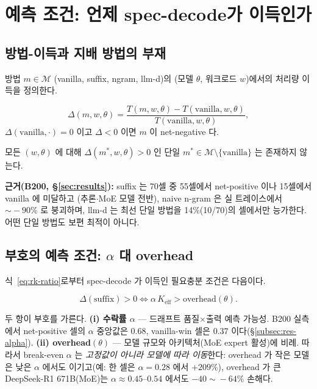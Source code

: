 
\section{예측 조건: 언제 spec-decode가 이득인가}
\label{sec:problem}

\subsection{방법-이득과 지배 방법의 부재}

방법 $m \in \mathcal{M}$ (vanilla, suffix, ngram, llm-d)의
(모델 $\theta$, 워크로드 $w$)에서의 처리량 이득을 정의한다.

\begin{definition}[방법-이득]
\label{def:method-gain}
\[
\Delta(m, w, \theta) = \frac{T(m, w, \theta) - T(\mathrm{vanilla}, w, \theta)}
                            {T(\mathrm{vanilla}, w, \theta)},
\]
$\Delta(\mathrm{vanilla},\cdot)=0$ 이고 $\Delta<0$ 이면 $m$ 이 net-negative 다.
\end{definition}

\begin{property}[지배 방법의 부재]
\label{prop:no-dominant}
모든 $(w,\theta)$ 에 대해 $\Delta(m^*,w,\theta)>0$ 인 단일
$m^*\in\mathcal{M}\setminus\{\mathrm{vanilla}\}$ 는 존재하지 않는다.
\end{property}

\noindent\textbf{근거(B200, \S\ref{sec:results}):}
suffix 는 70셀 중 55셀에서 net-positive 이나 15셀에서 vanilla 에 미달하고
(추론$\cdot$MoE 모델 전반), naive n-gram 은 실 트레이스에서 $\sim\!-90\%$ 로 붕괴하며,
llm-d 는 최선 단일 방법을 14\%(10/70)의 셀에서만 능가한다.
어떤 단일 방법도 보편 최적이 아니다.

\subsection{부호의 예측 조건: $\alpha$ 대 overhead}

식~\ref{eq:rk-ratio}로부터 spec-decode 가 이득인 필요충분 조건은 다음이다.

\begin{equation}
\Delta(\mathrm{suffix}) > 0 \iff \alpha\,K_{\mathrm{eff}} > \mathrm{overhead}(\theta).
\label{eq:rk-condition}
\end{equation}

두 항이 부호를 가른다.
\textbf{(i) 수락률 $\alpha$} — 드래프트 품질$\times$출력 예측 가능성.
B200 실측에서 net-positive 셀의 $\alpha$ 중앙값은 $0.68$,
vanilla-win 셀은 $0.37$ 이다(\S\ref{subsec:res-alpha}).
\textbf{(ii) overhead$(\theta)$} — 모델 규모와 아키텍처(MoE expert 활성)에 비례.
따라서 break-even $\alpha$ 는 \emph{고정값이 아니라 모델에 따라 이동}한다:
overhead 가 작은 모델은 낮은 $\alpha$ 에서도 이기고(예: 한 셀은 $\alpha\!=\!0.28$ 에서 $+209\%$),
overhead 가 큰 DeepSeek-R1 671B(MoE)는 $\alpha\!\approx\!0.45\text{--}0.54$ 에서도 $-40\!\sim\!-64\%$ 손해다.

